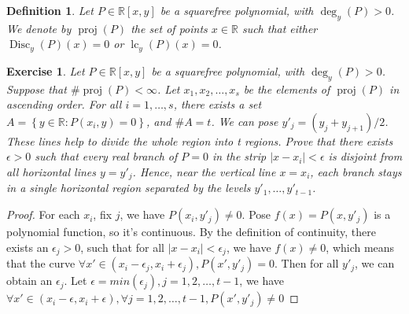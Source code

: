 \documentclass{article}
\newtheorem{definition}{Definition}
\newtheorem{exercise}{Exercise}
\begin{document}
\begin{definition}
    Let $P\in\mathbb{R}[x,y]$ be a squarefree polynomial, with $\deg_{y}(P) > 0$. We denote by $\operatorname{proj}(P)$ the set of points $x\in\mathbb{R}$ such that either $\operatorname{Disc}_{y}(P)(x)=0$ or $\operatorname{lc}_{y}(P)(x)=0$.
\end{definition}

\begin{exercise}
    Let $P \in \mathbb{R}[x,y]$ be a squarefree polynomial, with $\deg_{y}(P) > 0$. Suppose that $\#\operatorname{proj}(P)<\infty$. Let $x_{1},x_{2},\dots,x_{s}$ be the elements of $\operatorname{proj}(P)$ in ascending order. For all $i = 1, \dots, s$,
    there exists a set \(A = \left\{y \in \mathbb{R}: P(x_{i},y) = 0\right\}\), and \(\#A = t\). We can pose \(y'_{j} = (y_{j} +y_{j+1})/2\). These lines help to divide the whole region into t regions. Prove that there exists \(\epsilon>0\) such that every real branch of \(P=0\) in the strip \(|x-x_i|<\epsilon\) is disjoint from all horizontal lines \(y=y'_j\). Hence, near the vertical line \(x=x_i\), each branch stays in a single horizontal region separated by the levels \(y'_1,\dots,y'_{t-1}\).
\end{exercise}

\begin{proof}
    For each \(x_{i}\), fix \(j\), we have \(P(x_{i}, y'_{j}) \neq 0\). Pose \(f(x) = P(x, y'_{j})\) is a polynomial function, so it's continuous. By the definition of continuity, there exists an \(\epsilon_{j} > 0\), such that for all \(|x-x_{i}| < \epsilon_{j}\), we have \(f(x) \neq 0\), which means that the curve \(\forall x' \in (x_{i}-\epsilon_{j}, x_{i}+\epsilon_{j}), P(x', y'_{j}) = 0\). Then for all \(y'_{j}\), we can obtain an \(\epsilon_{j}\). Let \(\epsilon = min(\epsilon_{j}), j = 1,2,\dots, t-1\), we have \(\forall x' \in (x_{i}-\epsilon, x_{i}+\epsilon), \forall j = 1,2,\dots, t-1, P(x', y'_{j}) \neq 0\)
\end{proof}
\end{document}
